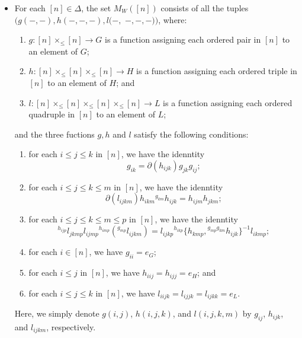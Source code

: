 \documentclass{tac}
\renewcommand{\to}{\rightarrow}
\begin{document}
\begin{itemize}
    \item For each $[n] \in \Delta$, the set $M_W([n])$ consists of all the tuples $(g(-,-), h(-,-,-), l(-,$ $-,-,-))$, where:
    \begin{enumerate}
        \item $g: [n] \times_{\le} [n] \to G$ is a function assigning each ordered pair in $[n]$ to an element of $G$;
        \item $h:[n] \times_{\le} [n] \times_{\le} [n] \to H$ is a function assigning  each ordered triple in $[n]$ to an element of $H$; and
        \item $l: [n] \times_{\le} [n] \times_{\le} [n] \times_{\le} [n] \to L$ is a function assigning each ordered quadruple in $[n]$ to an element of $L$;
    \end{enumerate}
    and the three fuctions $g,h$ and $l$ satisfy the following conditions:
    
	
\begin{enumerate}[label=(\alph*)]
\item for each $i \le j \le k$ in $[n]$, we have the idenntity 
\begin{equation}
g_{ik} = \partial(h_{ijk})g_{jk}g_{ij};
\label{r2-simplex}
\end{equation}
\item for each $i \le j \le k \le m$ in $[n]$, we have the idenntity 
\begin{equation}
\partial (l_{ijkm})  h_{ikm}{^{g_{km}}}h_{ijk} = h_{ijm}h_{jkm};
\label{r3-simplex}
\end{equation}
\item for each $i \le j \le k \le m \le p$ in $[n]$, we have the idenntity 
\begin{equation}
 {^{h_{ijp}}}l_{jkmp}l_{ijmp}{^{h_{imp}}}\left({^{g_{mp}}}l_{ijkm}\right) = l_{ijkp}{^{h_{ikp}}}\{h_{kmp},{^{g_{mp}g_{km}}}h_{ijk} \}^{-1}l_{ikmp};
\label{r4-simplex}
\end{equation}
 \item for each $i \in [n]$, we have $g_{ii} = e_G$;
        
 \item for each $i \le j$ in $[n]$, we have $h_{iij} = h_{ijj} = e_H$; and
        
 \item for each $i \le j \le k$ in $[n]$, we have $l_{iijk} = l_{ijjk} = l_{ijkk} = e_L$.
    \end{enumerate}
    
    Here, we simply denote  $g(i,j)$, $h(i,j,k)$, and $l(i,j,k,m)$ by $g_{ij}$, $h_{ijk}$, and $l_{ijkm}$, respectively.
    

\end{itemize}
\end{document}
